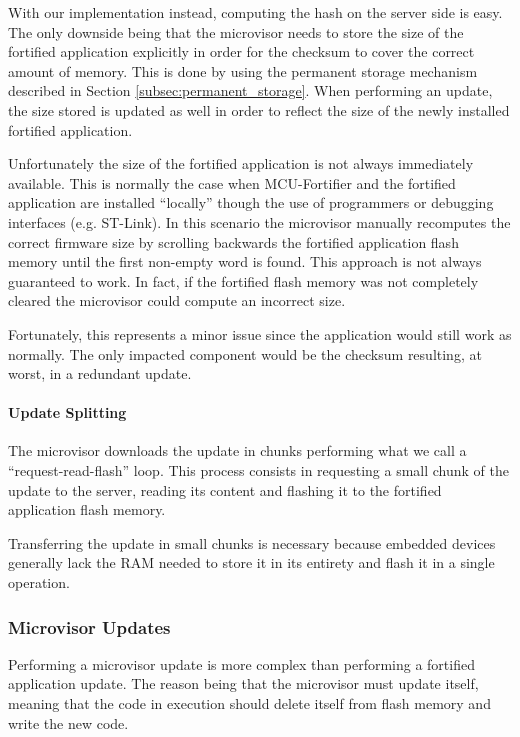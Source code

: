 \documentclass{article}
\begin{document}
With our implementation instead, computing the hash on the server side is easy. The only downside being that the microvisor needs to store the size of the fortified application explicitly in order for the checksum to cover the correct amount of memory. This is done by using the permanent storage mechanism described in Section \ref{subsec:permanent_storage}. When performing an update, the size stored is updated as well in order to reflect the size of the newly installed fortified application.

Unfortunately the size of the fortified application is not always immediately available. This is normally the case when MCU-Fortifier and the fortified application are installed ``locally'' though the use of programmers or debugging interfaces (e.g. ST-Link). In this scenario the microvisor manually recomputes the correct firmware size by scrolling backwards the fortified application flash memory until the first non-empty word is found.
This approach is not always guaranteed to work. In fact, if the fortified flash memory was not completely cleared the microvisor could compute an incorrect size.

Fortunately, this represents a minor issue since the application would still work as normally. The only impacted component would be the checksum resulting, at worst, in a redundant update.

\paragraph{Update Splitting}
The microvisor downloads the update in chunks performing what we call a ``request-read-flash'' loop. This process consists in requesting a small chunk of the update to the server, reading its content and flashing it to the fortified application flash memory.

Transferring the update in small chunks is necessary because embedded devices generally lack the RAM needed to store it in its entirety and flash it in a single operation.

\subsubsection{Microvisor Updates}
Performing a microvisor update is more complex than performing a fortified application update. The reason being that the microvisor must update itself, meaning that the code in execution should delete itself from flash memory and write the new code.
\end{document}
